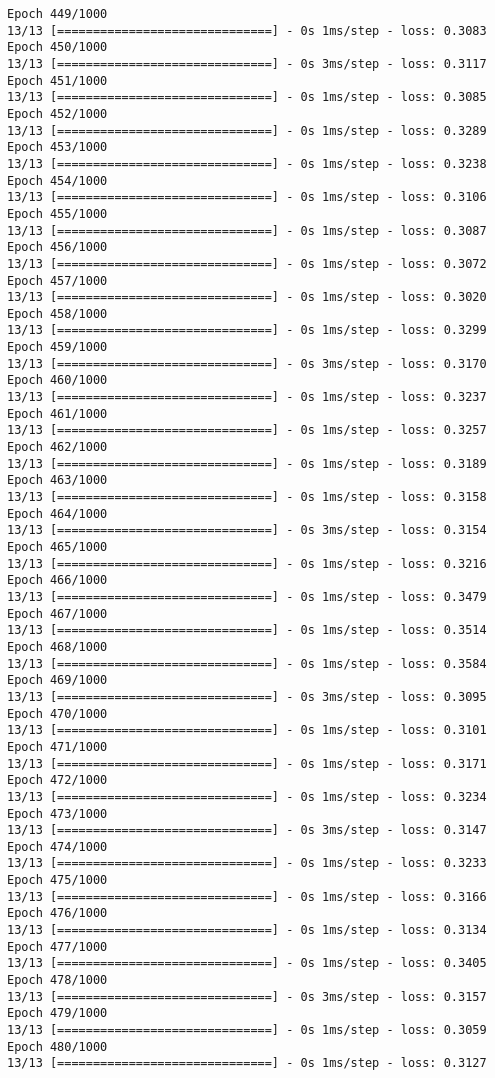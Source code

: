 \documentclass[11pt]{article}
\begin{document}
\begin{Verbatim}[commandchars=\\\{\}]
Epoch 449/1000
13/13 [==============================] - 0s 1ms/step - loss: 0.3083
Epoch 450/1000
13/13 [==============================] - 0s 3ms/step - loss: 0.3117
Epoch 451/1000
13/13 [==============================] - 0s 1ms/step - loss: 0.3085
Epoch 452/1000
13/13 [==============================] - 0s 1ms/step - loss: 0.3289
Epoch 453/1000
13/13 [==============================] - 0s 1ms/step - loss: 0.3238
Epoch 454/1000
13/13 [==============================] - 0s 1ms/step - loss: 0.3106
Epoch 455/1000
13/13 [==============================] - 0s 1ms/step - loss: 0.3087
Epoch 456/1000
13/13 [==============================] - 0s 1ms/step - loss: 0.3072
Epoch 457/1000
13/13 [==============================] - 0s 1ms/step - loss: 0.3020
Epoch 458/1000
13/13 [==============================] - 0s 1ms/step - loss: 0.3299
Epoch 459/1000
13/13 [==============================] - 0s 3ms/step - loss: 0.3170
Epoch 460/1000
13/13 [==============================] - 0s 1ms/step - loss: 0.3237
Epoch 461/1000
13/13 [==============================] - 0s 1ms/step - loss: 0.3257
Epoch 462/1000
13/13 [==============================] - 0s 1ms/step - loss: 0.3189
Epoch 463/1000
13/13 [==============================] - 0s 1ms/step - loss: 0.3158
Epoch 464/1000
13/13 [==============================] - 0s 3ms/step - loss: 0.3154
Epoch 465/1000
13/13 [==============================] - 0s 1ms/step - loss: 0.3216
Epoch 466/1000
13/13 [==============================] - 0s 1ms/step - loss: 0.3479
Epoch 467/1000
13/13 [==============================] - 0s 1ms/step - loss: 0.3514
Epoch 468/1000
13/13 [==============================] - 0s 1ms/step - loss: 0.3584
Epoch 469/1000
13/13 [==============================] - 0s 3ms/step - loss: 0.3095
Epoch 470/1000
13/13 [==============================] - 0s 1ms/step - loss: 0.3101
Epoch 471/1000
13/13 [==============================] - 0s 1ms/step - loss: 0.3171
Epoch 472/1000
13/13 [==============================] - 0s 1ms/step - loss: 0.3234
Epoch 473/1000
13/13 [==============================] - 0s 3ms/step - loss: 0.3147
Epoch 474/1000
13/13 [==============================] - 0s 1ms/step - loss: 0.3233
Epoch 475/1000
13/13 [==============================] - 0s 1ms/step - loss: 0.3166
Epoch 476/1000
13/13 [==============================] - 0s 1ms/step - loss: 0.3134
Epoch 477/1000
13/13 [==============================] - 0s 1ms/step - loss: 0.3405
Epoch 478/1000
13/13 [==============================] - 0s 3ms/step - loss: 0.3157
Epoch 479/1000
13/13 [==============================] - 0s 1ms/step - loss: 0.3059
Epoch 480/1000
13/13 [==============================] - 0s 1ms/step - loss: 0.3127

\end{Verbatim}
\end{document}
